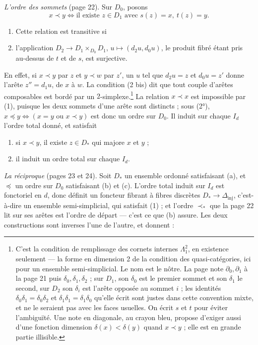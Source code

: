 \documentclass[11pt,a4paper]{article}
\begin{document}
\emph{L'ordre des sommets} (page 22). Sur $D_0$, posons
\[
  x \prec y \iff \text{il existe } z \in D_1 \text{ avec } s(z) = x,\ t(z) = y .
\]
\begin{enumerate}
  \item[(2°)] Cette relation est transitive si
  \item[(2 bis)] l'application $D_2 \to D_1 \times_{D_0} D_1$, $u \mapsto
  (d_2u, d_0u)$, le produit fibré étant pris au-dessus de $t$ et de $s$, est
  surjective.
\end{enumerate}
En effet, si $x \prec y$ par $z$ et $y \prec w$ par $z'$, un $u$ tel que $d_2 u
= z$ et $d_0 u = z'$ donne l'arête $z'' = d_1 u$, de $x$ à $w$. La condition
(2 bis) dit que tout couple d'arêtes composables est bordé par un
$2$-simplexe.\footnote{C'est la condition de remplissage des cornets internes
$\Lambda^2_1$, en existence seulement --- la forme en dimension 2 de la
condition des quasi-catégories, ici pour un ensemble semi-simplicial. Le nom
est le nôtre. La page note $\partial_0, \partial_1$ à la page 21 puis
$\delta_0, \delta_1, \delta_2$ ; sur $D_1$, son $\delta_0$ est le premier
sommet et son $\delta_1$ le second, sur $D_2$ son $\delta_i$ est l'arête
opposée au sommet $i$ ; les identités $\delta_0\delta_1 = \delta_0\delta_2$
et $\delta_1\delta_1 = \delta_1\delta_0$ qu'elle écrit sont justes dans cette
convention mixte, et ne le seraient pas avec les faces usuelles. On écrit $s$
et $t$ pour éviter l'ambiguïté. Une note en diagonale, au crayon bleu, propose
d'exiger aussi d'une fonction dimension $\delta(x) < \delta(y)$ quand $x \prec
y$ ; elle est en grande partie illisible.} La relation $x \prec x$ est
impossible par (1), puisque les deux sommets d'une arête sont distincts ;
sous (2°), $x \preccurlyeq y \iff (x = y \text{ ou } x \prec y)$ est donc un
ordre sur $D_0$. Il induit sur chaque $I_d$ l'ordre total donné, et satisfait
\begin{enumerate}
  \item[(b)] si $x \prec y$, il existe $z \in D_*$ qui majore $x$ et $y$ ;
  \item[(c)] il induit un ordre total sur chaque $I_d$.
\end{enumerate}

\emph{La réciproque} (pages 23 et 24). Soit $D_*$ un ensemble ordonné
satisfaisant (a), et $\preccurlyeq$ un ordre sur $D_0$ satisfaisant (b) et
(c). L'ordre total induit sur $I_d$ est fonctoriel en $d$, donc définit un
foncteur fibrant à fibres discrètes $D_* \to \Delta_{\mathrm{inj}}$, c'est-à-dire
un ensemble semi-simplicial, qui satisfait (1) ; et l'ordre $\prec_*$ que la
page 22 lit sur ses arêtes est l'ordre de départ --- c'est ce que (b)
assure. Les deux constructions sont inverses l'une de l'autre, et donnent :
\end{document}
